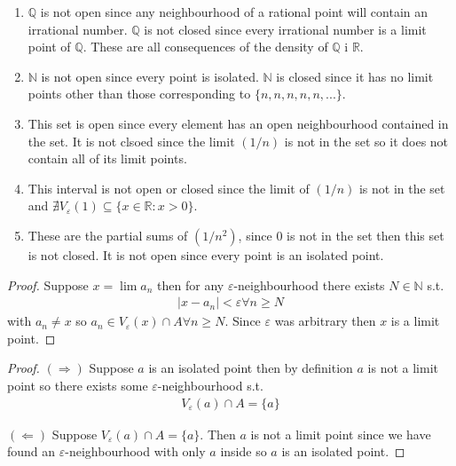 \begin{enumerate}[label=(\alph*)]
    \item 
    $\mathbb{Q}$ is not open since any neighbourhood
    of a rational point will contain an irrational number.
    $\mathbb{Q}$ is not closed since every irrational number is
    a limit point of $\mathbb{Q}$. These are all consequences
    of the density of $\mathbb{Q}$ i $\mathbb{R}$.

    \item 
    $\mathbb{N}$ is not open since every point is isolated.
    $\mathbb{N}$ is closed since it has no limit points 
    other than those corresponding to $\{n,n,n,n,n,...\}$.

    \item 
    This set is open since every element has an open neighbourhood
    contained in the set. It is not clsoed since the limit 
    $(1/n)$ is not in the set so it does not contain all of its limit 
    points.

    \item 
    This interval is not open or closed since the limit of $(1/n)$
    is not in the set and $\nexists V_\varepsilon(1) \subseteq \{ x\in \mathbb{R} : x>0 \}$.

    \item
    These are the partial sums of $(1/n^2)$, since $0$
    is not in the set then this set is not closed.
    It is not open since every point is an isolated point.
\end{enumerate}

\begin{proof}
    Suppose $x=\lim a_n$ then for any $\varepsilon$-neighbourhood
    there exists $N\in \mathbb{N}$ s.t. 
    \begin{align*}
        |x-a_n| < \varepsilon \forall n \geq N
    \end{align*}
    with $a_n \neq x$ so $a_n \in V_\varepsilon(x)\cap A \forall n\geq N$.
    Since $\varepsilon$ was arbitrary then $x$ is a limit point.
\end{proof}

\begin{proof}
    $(\Rightarrow)$ Suppose $a$ is an isolated point then by 
    definition $a$ is not a limit point so there exists some 
    $\varepsilon$-neighbourhood s.t. 
    \begin{align*}
        V_\varepsilon(a) \cap A = \{ a \}
    \end{align*}

    $(\Leftarrow)$ Suppose $V_\varepsilon(a)\cap A = \{ a \}$.
    Then $a$ is not a limit point since we have found an $\varepsilon$-neighbourhood
    with only $a$ inside so $a$ is an isolated point. 
\end{proof}

